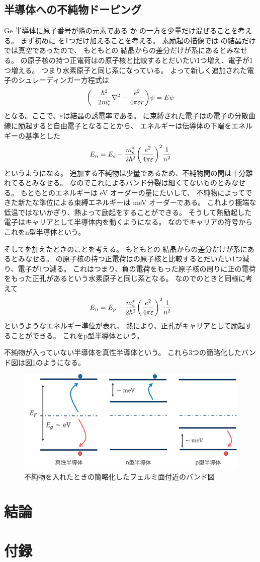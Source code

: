 \documentclass[11pt,dvipdfmx,a4paper]{jsarticle}
\numberwithin{equation}{section}
\begin{document}
\subsection{半導体への不純物ドーピング}
Ge 半導体に原子番号が隣の元素である  か  の一方を少量だけ混ぜることを考える。
まず初めに  を1つだけ加えることを考える。
素励起の描像では  の結晶だけでは真空であったので、
もともとの  結晶からの差分だけが系にあるとみなせる。
 の原子核の持つ正電荷はの原子核と比較するとだいたい1つ増え、電子が1つ増える。
つまり水素原子と同じ系になっている。
よって新しく追加された電子のシュレーディンガー方程式は
\begin{equation}
	\qty(-\frac{\hbar^2}{2m_e^*}\laplacian - \frac{e^2}{4\pi\varepsilon r})\psi = E \psi
\end{equation}
となる。ここで、\(\varepsilon\)は結晶の誘電率である。
 に束縛された電子はの電子の分散曲線に励起すると自由電子となることから、
エネルギーは伝導体の下端をエネルギーの基準とした
\begin{equation}
	E_n = E_e - \frac{m_e^*}{2\hbar^2}\qty(\frac{e^2}{4\pi \varepsilon})^2\frac{1}{n^2}
\end{equation}
というようになる。
追加する不純物は少量であるため、不純物間の間は十分離れてるとみなせる。
なのでこれによるバンド分裂は細くてないものとみなせる。
もともとのエネルギーは eV オーダーの量にたいして、
不純物によってできた新たな準位による束縛エネルギーは meV オーダーである。
これより極端な低温ではないかぎり、熱よって励起をすることができる。
そうして熱励起した電子はキャリアとして半導体内を動くようになる。
なのでキャリアの符号からこれをn型半導体という。

そしてを加えたときのことを考える。
もともとの  結晶からの差分だけが系にあるとみなせる。
 の原子核の持つ正電荷はの原子核と比較するとだいたい1つ減り、電子が1つ減る。
これはつまり、負の電荷をもった原子核の周りに正の電荷をもった正孔があるという水素原子と同じ系となる。
なのでのときと同様に考えて
\begin{equation}
	E_n = E_p - \frac{m_e^*}{2\hbar^2}\qty(\frac{e^2}{4\pi \varepsilon})^2\frac{1}{n^2}
\end{equation}
というようなエネルギー準位が表れ、
熱により、正孔がキャリアとして励起することができる。
これをp型半導体という。

不純物が入っていない半導体を真性半導体という。
これら3つの簡略化したバンド図は図\ref{fig:01}のようになる。 %
\begin{figure}[h]
	\centering
	\includegraphics[width=0.65\columnwidth]{fig/fig01.png}
	\caption{不純物を入れたときの簡略化したフェルミ面付近のバンド図}
	\label{fig:01}
\end{figure}

\section{結論}




\section*{付録}
\end{document}
